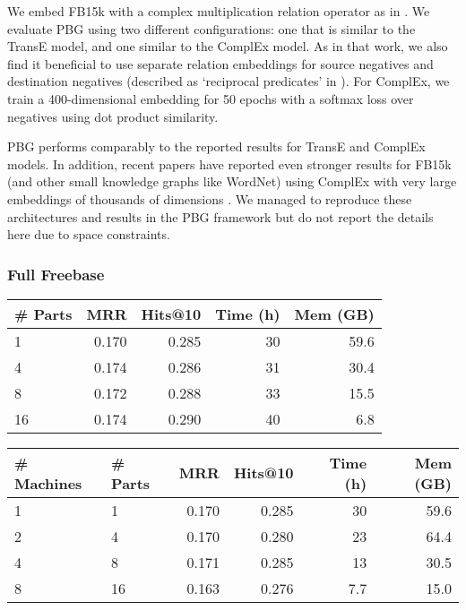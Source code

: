 \documentclass{article}
\begin{document}
We embed FB15k with a complex multiplication relation operator as in \cite{trouillon2016complex}. We evaluate PBG using two different configurations: one that is similar to the TransE model, and one similar to the ComplEx model.  As in that work, we also find it beneficial to use separate relation embeddings for source negatives and destination negatives (described as `reciprocal predicates' in \citealt{lacroix2018canonical}). For ComplEx, we train a 400-dimensional embedding for 50 epochs with a softmax loss over negatives using dot product similarity.

PBG performs comparably to the reported results for TransE and ComplEx models. In addition, recent papers have reported even stronger results for FB15k (and other small knowledge graphs like WordNet) using ComplEx with very large embeddings of thousands of dimensions \cite{lacroix2018canonical}. We managed to reproduce these architectures and results in the PBG framework but do not report the details here due to space constraints.
 



















\subsubsection{Full Freebase}

\begin{table*}[ht]
\centering
\small

\begin{tabular}{l r r r r}
\hline
\# Parts & MRR & Hits@10 & Time (h) & Mem (GB) \\\hline
1  & 0.170 & 0.285 & 30  & 59.6\\
\hline
4  & 0.174 & 0.286 & 31 & 30.4\\
8  & 0.172 & 0.288 & 33 & 15.5 \\
16 & 0.174 & 0.290 & 40 & 6.8\\\hline 
\end{tabular}
\quad
\begin{tabular}{l l r r r r}
\hline
\# Machines &  \# Parts & MRR & Hits@10 & Time (h) &  Mem (GB) \\\hline
1  & 1 & 0.170 & 0.285 & 30 & 59.6 \\
\hline
2 & 4 & 0.170 & 0.280 & 23 & 64.4 \\
4 & 8 & 0.171 & 0.285 & 13 & 30.5 \\
8 & 16 & 0.163 & 0.276 & 7.7 & 15.0 \\\hline 
\end{tabular}
\caption{Model evaluation, training time (10 epochs) and peak memory usage for embeddings of the full Freebase knowledge graph. MRR and Hits@10 are evaluated in the \textit{raw} setting. \textbf{Left:} Training with different numbers of partitions on a single machine. \textbf{Right:} Distributed training on different numbers of machines. 
}
\label{tab:fb-full}
\end{table*}
\end{document}

